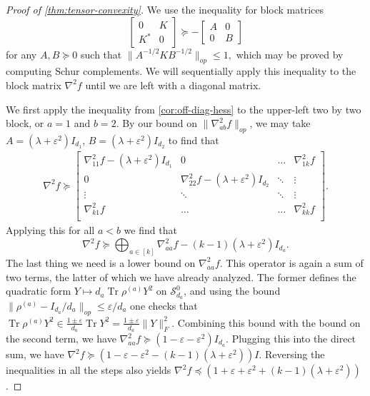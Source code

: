 \documentclass{article}
\newcommand\eps{\varepsilon}
\newcommand\Sym{\mathcal{S}}
\newcommand\tr{\operatorname{Tr}}
\newcommand{\CF}[1]{{\color{purple}[CF: #1]}}
\begin{document}
\begin{proof}[Proof of \cref{thm:tensor-convexity}] 
We use the inequality for block matrices 
$$\begin{bmatrix} 0 & K \\ K^{*} & 0 \end{bmatrix} \succeq - \begin{bmatrix} A & 0 \\ 0 & B \end{bmatrix}$$ for any $A,B \succeq 0$ such that $\|A^{-1/2} K B^{-1/2}\|_{op} \leq 1,$ which may be proved by computing Schur complements. We will sequentially apply this inequality to the block matrix $\nabla^2 f$ until we are left with a diagonal matrix. 

We first apply the inequality from \cref{cor:off-diag-hess} to the upper-left two by two block, or $a = 1$ and $b = 2$. By our bound on $\|\nabla^2_{ab} f\|_{op}$, we may take 
   $A = (\lambda + \eps^2) I_{d_1}$, $B = (\lambda + \eps^2)I_{d_2}$ to find that 
   \begin{align*}
\nabla^2 f \succeq \begin{bmatrix}
 \nabla^2_{11} f - (\lambda + \eps^2) I_{d_1} & 0 & \hdots &  \nabla^2_{1k} f \\
0 & \nabla^2_{22} f - (\lambda + \eps^2) I_{d_2} & \ddots & \vdots \\
\vdots & \ddots & \ddots & \vdots\\
\nabla^2_{k1}f & \hdots &  \hdots & \nabla^2_{kk} f \\
  \end{bmatrix}.\end{align*}
 Applying this for all $a < b$ we find that 
 $$\nabla^2 f  \succeq \bigoplus_{a \in [k]} \nabla^2_{aa} f - (k - 1) (\lambda + \eps^2) I_{d_a}.$$ 
The last thing we need is a lower bound on $\nabla^2_{aa} f.$ This operator is again a sum of two terms, the latter of which we have already analyzed. The former defines the quadratic form $Y \mapsto d_a \tr \rho^{(a)} Y^2$ on $\Sym^0_{d_a}$, and using the bound $\|\rho^{(a)} - I_{d_a}/{d_a}\|_{op} \leq \eps/d_a$ one checks that $\tr \rho^{(a)} Y^2 \in \frac{1 \pm \eps }{d_a} \tr Y^2 = \frac{1 \pm \eps }{d_a} \|Y\|_{F}^2. $ Combining this bound with the bound on the second term, we have $\nabla^2_{aa} f \succeq (1 -  \eps  - \eps^2 ) I_{d_a}$. Plugging this into the direct sum, we have $\nabla^2 f \succeq (1  - \eps - \eps^2  - (k - 1) (\lambda + \eps^2)) I$. Reversing the inequalities in all the steps also yields $\nabla^2 f \preceq (1  + \eps + \eps^2  + (k - 1) (\lambda + \eps^2))$.
\end{proof}
\end{document}

